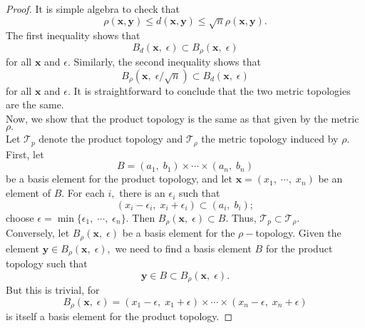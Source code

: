 \documentclass{article}
\theoremstyle{definition}
\begin{document}
\begin{proof}
  It is simple algebra to check that
  \[\rho(\mathbf{x}, \mathbf{y}) \leq d(\mathbf{x}, \mathbf{y}) \leq \sqrt{n} \rho(\mathbf{x}, \mathbf{y}).\]
  The first inequality shows that
  \[B_{d}(\mathbf{x},\; \epsilon) \subset B_{\rho}(\mathbf{x},\; \epsilon)\]
  for all $\mathbf{x}$ and $\epsilon.$ Similarly, the second inequality shows that
  \[B_{\rho}(\mathbf{x},\; \epsilon / \sqrt{n}) \subset B_{d}(\mathbf{x},\; \epsilon)\]
  for all $\mathbf{x}$ and $\epsilon.$ It is straightforward to conclude that the two metric topologies are the same.\\
  Now, we show that the product topology is the same as that given by the metric $\rho.$\\
  Let $\mathcal{T}_p$ denote the product topology and $\mathcal{T}_\rho$ the metric topology induced by $\rho.$
  First, let
  \[B=\left(a_{1},\; b_{1}\right) \times \cdots \times\left(a_{n},\; b_{n}\right)\]
  be a basis element for the product topology, and let $\mathbf{x} = (x_1,\;\cdots,\; x_n)$ be an element of $B.$ For each $i,$ there is an $\epsilon_i$ such that
  \[\left(x_{i}-\epsilon_{i},\; x_{i}+\epsilon_{i}\right) \subset\left(a_{i},\; b_{i}\right);\]
  choose $\epsilon = \min\{\epsilon_1,\;\cdots,\; \epsilon_n\}.$ Then $B_\rho(\mathbf{x},\; \epsilon) \subset B.$  Thus, $\mathcal{T}_p \subset \mathcal{T}_\rho.$\\
  Conversely, let $B_\rho(\mathbf{x},\; \epsilon)$ be a basis element for the $\rho-$topology. Given the element $\mathbf{y} \in B_{\rho}(\mathbf{x},\; \epsilon),$ we need to find a basis element $B$ for the product topology such that
  \[\mathbf{y} \in B \subset B_{\rho}(\mathbf{x},\; \epsilon).\]
  But this is trivial, for
  \[B_{\rho}(\mathbf{x},\; \epsilon)=\left(x_{1}-\epsilon,\; x_{1}+\epsilon\right) \times \cdots \times\left(x_{n}-\epsilon,\; x_{n}+\epsilon\right)\]
  is itself a basis element for the product topology.
\end{proof}
\newpage
%
\end{document}
